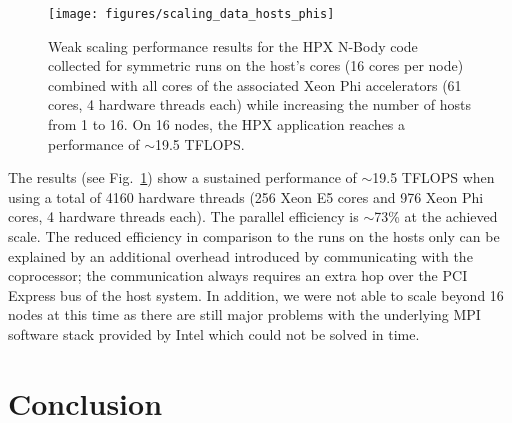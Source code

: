 \documentclass{sig-alternate}
\newcommand{\B}[1]{\textbf{#1}}
\newcommand{\F}[1]{\B{\textcolor{red}{FIXME: #1}}}
\newcommand{\upp}{\vspace*{-0.5em}}
\newcommand{\up}{\vspace*{-0.25em}}
\begin{document}
\begin{figure}[ht]
\vspace*{2em}
  \texttt{[image: figures/scaling\_data\_hosts\_phis]}
    \upp\upp
  \caption{Weak scaling performance results for the HPX N-Body code collected for symmetric runs
     on the host's cores (16 cores per node) combined with all cores of the
    associated Xeon Phi accelerators (61 cores, 4 hardware threads each)
    while increasing the number of hosts from 1 to 16. On 16 nodes, the
    HPX application reaches a performance of $\sim$19.5 TFLOPS.}
\label{fig:results_hosts_phis}
\end{figure}

The results (see Fig.~\ref{fig:results_hosts_phis}) show a sustained performance
of $\sim$19.5 TFLOPS when using a total of 4160 hardware threads (256 Xeon E5 cores
and 976 Xeon Phi cores, 4 hardware threads each). The parallel efficiency is $\sim$73\% at the achieved
scale. The reduced efficiency in comparison to the runs on the hosts only can be
explained by an additional overhead introduced by communicating
with the coprocessor; the communication always requires an extra hop over the PCI
Express bus of the host system. In addition, we were not able to scale beyond 16
nodes at this time as there are still major problems with the underlying MPI software
stack provided by Intel which could not be solved in time.




\upp
\section{Conclusion}
\end{document}
